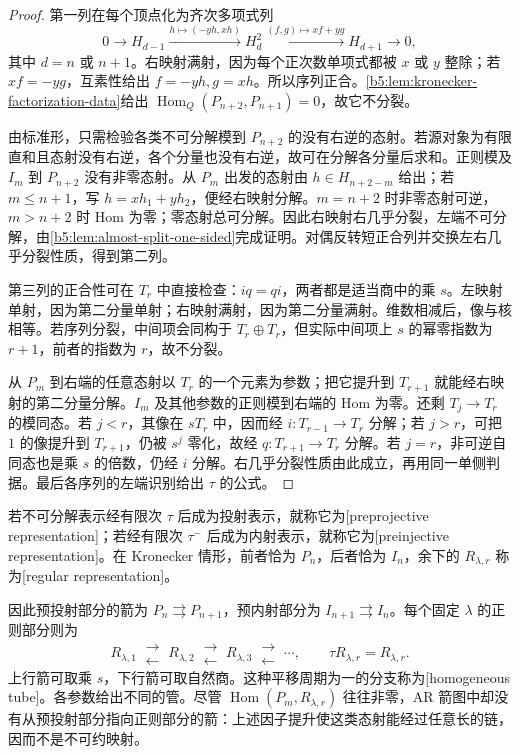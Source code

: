 \begin{proof}
	第一列在每个顶点化为齐次多项式列
	\[
		0\longrightarrow H_{d-1}\xrightarrow{h\mapsto(-yh,xh)}H_d^2
		\xrightarrow{(f,g)\mapsto xf+yg}H_{d+1}\longrightarrow0,
	\]
	其中 \(d=n\) 或 \(n+1\)。右映射满射，因为每个正次数单项式都被 \(x\) 或 \(y\) 整除；若 \(xf=-yg\)，互素性给出 \(f=-yh,g=xh\)。所以序列正合。\cref{b5:lem:kronecker-factorization-data}给出 \(\operatorname{Hom}_Q(P_{n+2},P_{n+1})=0\)，故它不分裂。

	由标准形，只需检验各类不可分解模到 \(P_{n+2}\) 的没有右逆的态射。若源对象为有限直和且态射没有右逆，各个分量也没有右逆，故可在分解各分量后求和。正则模及 \(I_m\) 到 \(P_{n+2}\) 没有非零态射。从 \(P_m\) 出发的态射由 \(h\in H_{n+2-m}\) 给出；若 \(m\le n+1\)，写 \(h=xh_1+yh_2\)，便经右映射分解。\(m=n+2\) 时非零态射可逆，\(m>n+2\) 时 Hom 为零；零态射总可分解。因此右映射右几乎分裂，左端不可分解，由\cref{b5:lem:almost-split-one-sided}完成证明。对偶反转短正合列并交换左右几乎分裂性质，得到第二列。

	第三列的正合性可在 \(T_r\) 中直接检查：\(iq=qi\)，两者都是适当商中的乘 \(s\)。左映射单射，因为第二分量单射；右映射满射，因为第二分量满射。维数相减后，像与核相等。若序列分裂，中间项会同构于 \(T_r\oplus T_r\)，但实际中间项上 \(s\) 的幂零指数为 \(r+1\)，前者的指数为 \(r\)，故不分裂。

	从 \(P_m\) 到右端的任意态射以 \(T_r\) 的一个元素为参数；把它提升到 \(T_{r+1}\) 就能经右映射的第二分量分解。\(I_m\) 及其他参数的正则模到右端的 Hom 为零。还剩 \(T_j\to T_r\) 的模同态。若 \(j<r\)，其像在 \(sT_r\) 中，因而经 \(i:T_{r-1}\to T_r\) 分解；若 \(j>r\)，可把 \(1\) 的像提升到 \(T_{r+1}\)，仍被 \(s^j\) 零化，故经 \(q:T_{r+1}\to T_r\) 分解。若 \(j=r\)，非可逆自同态也是乘 \(s\) 的倍数，仍经 \(i\) 分解。右几乎分裂性质由此成立，再用同一单侧判据。最后各序列的左端识别给出 \(\tau\) 的公式。
\end{proof}

若不可分解表示经有限次 \(\tau\) 后成为投射表示，就称它为[preprojective representation]；若经有限次 \(\tau^{-}\) 后成为内射表示，就称它为[preinjective representation]。在 Kronecker 情形，前者恰为 \(P_n\)，后者恰为 \(I_n\)，余下的 \(R_{\lambda,r}\) 称为[regular representation]。

因此预投射部分的箭为 \(P_n\rightrightarrows P_{n+1}\)，预内射部分为 \(I_{n+1}\rightrightarrows I_n\)。每个固定 \(\lambda\) 的正则部分则为
\[
	R_{\lambda,1}\ \substack{\longrightarrow\\[-2pt]\longleftarrow}\
	R_{\lambda,2}\ \substack{\longrightarrow\\[-2pt]\longleftarrow}\
	R_{\lambda,3}\ \substack{\longrightarrow\\[-2pt]\longleftarrow}\
	\cdots,
	\qquad \tau R_{\lambda,r}=R_{\lambda,r}.
\]
上行箭可取乘 \(s\)，下行箭可取自然商。这种平移周期为一的分支称为[homogeneous tube]。各参数给出不同的管。尽管 \(\operatorname{Hom}(P_m,R_{\lambda,r})\) 往往非零，AR 箭图中却没有从预投射部分指向正则部分的箭：上述因子提升使这类态射能经过任意长的链，因而不是不可约映射。

